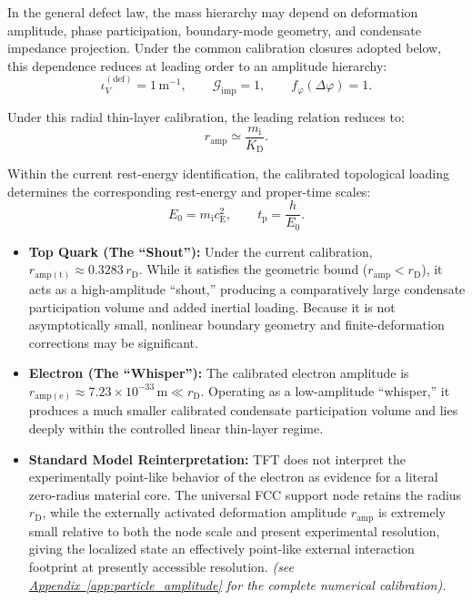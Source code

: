 In the general defect law, the mass hierarchy may depend on deformation amplitude, phase participation, boundary-mode geometry, and condensate impedance projection. Under the common calibration closures adopted below, this dependence reduces at leading order to an amplitude hierarchy:
\begin{equation}
    \iota_V^{(\mathrm{def})} = 1\,\mathrm{m}^{-1}, \qquad \mathcal{G}_{\mathrm{imp}} = 1, \qquad f_\varphi(\Delta\varphi) = 1.
\end{equation}

Under this radial thin-layer calibration, the leading relation reduces to:
\begin{equation}
    r_{\mathrm{amp}} \simeq \frac{m_{\mathrm{i}}}{K_{\mathrm{D}}}.
\end{equation}

Within the current rest-energy identification, the calibrated topological loading determines the corresponding rest-energy and proper-time scales:
\begin{equation}
    E_0 = m_{\mathrm{i}}c_{\mathrm{E}}^2, \qquad t_{\mathrm{p}} = \frac{h}{E_0}.
\end{equation}

\begin{itemize}
    \item \textbf{Top Quark (The ``Shout''):} Under the current calibration, $r_{\mathrm{amp(t)}} \approx 0.3283\,r_{\mathrm{D}}$. While it satisfies the geometric bound ($r_{\mathrm{amp}} < r_{\mathrm{D}}$), it acts as a high-amplitude ``shout,'' producing a comparatively large condensate participation volume and added inertial loading. Because it is not asymptotically small, nonlinear boundary geometry and finite-deformation corrections may be significant.
    
    \item \textbf{Electron (The ``Whisper''):} The calibrated electron amplitude is $r_{\mathrm{amp(e)}} \approx 7.23\times10^{-33}\,\mathrm{m} \ll r_{\mathrm{D}}$. Operating as a low-amplitude ``whisper,'' it produces a much smaller calibrated condensate participation volume and lies deeply within the controlled linear thin-layer regime.
    
    \item \textbf{Standard Model Reinterpretation:} TFT does not interpret the experimentally point-like behavior of the electron as evidence for a literal zero-radius material core. The universal FCC support node retains the radius $r_{\mathrm{D}}$, while the externally activated deformation amplitude $r_{\mathrm{amp}}$ is extremely small relative to both the node scale and present experimental resolution, giving the localized state an effectively point-like external interaction footprint at presently accessible resolution. \textit{(see \hyperref[app:particle_amplitude]{Appendix~\ref*{app:particle_amplitude}} for the complete numerical calibration).}
\end{itemize}

